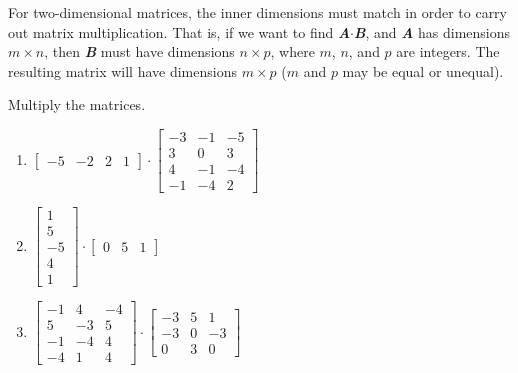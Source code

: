 \begin{mdframed}[style = important, frametitle = {Matrix Multiplication}]
For two-dimensional matrices, the inner dimensions must match in order to
carry out matrix multiplication. That is, if we want to find \textbf{\textit{
A}}$\cdot$\textbf{\textit{B}}, and \textbf{\textit{A}} has dimensions $m
\times n$, then \textbf{\textit{B}} must have dimensions $n \times p$, where
$m$, $n$, and $p$ are integers. The resulting matrix will have dimensions $m
\times p$ ($m$ and $p$ may be equal or unequal).
\end{mdframed}

\begin{Exercise}[title = {Multiplying Matrices 1}, label = mult_mat1]
Multiply the matrices.
\begin{enumerate}
\item $\begin{bmatrix}
-5 & -2 & 2 & 1
\end{bmatrix} \cdot \begin{bmatrix}
-3 & -1 & -5\\
3 & 0 & 3\\
4 & -1 & -4\\
-1 & -4 & 2
\end{bmatrix}$
\item $\begin{bmatrix}
1\\
5\\
-5\\
4\\
1
\end{bmatrix} \cdot \begin{bmatrix}
0 & 5 & 1
\end{bmatrix}$
\item $\begin{bmatrix}
-1 & 4 & -4\\
5 & -3 & 5\\
-1 & -4 & 4\\
-4 & 1 & 4
\end{bmatrix} \cdot \begin{bmatrix}
-3 & 5 & 1\\
-3 & 0 & -3\\
0 & 3 & 0
\end{bmatrix}$
\end{enumerate}
\end{Exercise}

